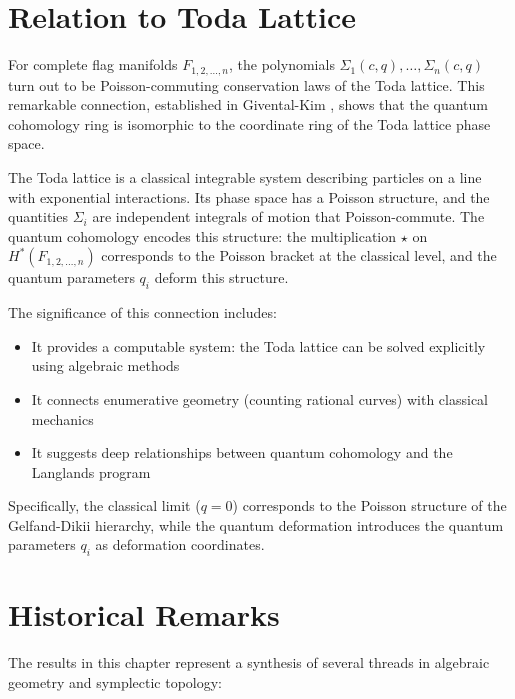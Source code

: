 \section{Relation to Toda Lattice}

For complete flag manifolds $F_{1,2,\ldots,n}$, the polynomials $\Sigma_1(c, q), \ldots, \Sigma_n(c, q)$ turn out to be Poisson-commuting conservation laws of the Toda lattice. This remarkable connection, established in Givental-Kim \cite{GiventalKim1995}, shows that the quantum cohomology ring is isomorphic to the coordinate ring of the Toda lattice phase space.

The Toda lattice is a classical integrable system describing particles on a line with exponential interactions. Its phase space has a Poisson structure, and the quantities $\Sigma_i$ are independent integrals of motion that Poisson-commute. The quantum cohomology encodes this structure: the multiplication $\star$ on $H^*(F_{1,2,\ldots,n})$ corresponds to the Poisson bracket at the classical level, and the quantum parameters $q_i$ deform this structure.

The significance of this connection includes:
\begin{itemize}
\item It provides a computable system: the Toda lattice can be solved explicitly using algebraic methods
\item It connects enumerative geometry (counting rational curves) with classical mechanics
\item It suggests deep relationships between quantum cohomology and the Langlands program
\end{itemize}

Specifically, the classical limit ($q=0$) corresponds to the Poisson structure of the Gelfand-Dikii hierarchy, while the quantum deformation introduces the quantum parameters $q_i$ as deformation coordinates.

\section{Historical Remarks}

The results in this chapter represent a synthesis of several threads in algebraic geometry and symplectic topology:

